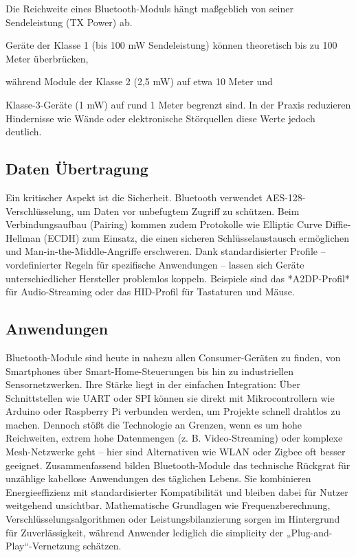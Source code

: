 Die Reichweite eines Bluetooth-Moduls hängt maßgeblich von seiner Sendeleistung (TX Power) ab. 

Geräte der Klasse 1 (bis 100 mW Sendeleistung) können theoretisch bis zu 100 Meter überbrücken, 

während Module der Klasse 2 (2,5 mW) auf etwa 10 Meter und

Klasse-3-Geräte (1 mW) auf rund 1 Meter begrenzt sind. In der Praxis reduzieren Hindernisse wie Wände oder elektronische Störquellen diese Werte jedoch deutlich.

\subsection*{Daten Übertragung}
Ein kritischer Aspekt ist die Sicherheit. Bluetooth verwendet AES-128-Verschlüsselung, um Daten vor unbefugtem Zugriff zu schützen. Beim Verbindungsaufbau (Pairing) kommen zudem Protokolle wie Elliptic Curve Diffie-Hellman (ECDH) zum Einsatz, die einen sicheren Schlüsselaustausch ermöglichen und Man-in-the-Middle-Angriffe erschweren. Dank standardisierter Profile – vordefinierter Regeln für spezifische Anwendungen – lassen sich Geräte unterschiedlicher Hersteller problemlos koppeln. Beispiele sind das *A2DP-Profil* für Audio-Streaming oder das HID-Profil für Tastaturen und Mäuse.

\subsection*{Anwendungen}

Bluetooth-Module sind heute in nahezu allen Consumer-Geräten zu finden, von Smartphones über Smart-Home-Steuerungen bis hin zu industriellen Sensornetzwerken. 
Ihre Stärke liegt in der einfachen Integration: Über Schnittstellen wie UART oder SPI können sie direkt mit Mikrocontrollern wie Arduino oder Raspberry Pi verbunden werden, um Projekte schnell drahtlos zu machen. 
Dennoch stößt die Technologie an Grenzen, wenn es um hohe Reichweiten, extrem hohe Datenmengen (z. B. Video-Streaming) oder komplexe Mesh-Netzwerke geht – hier sind Alternativen wie WLAN oder Zigbee oft besser geeignet.
Zusammenfassend bilden Bluetooth-Module das technische Rückgrat für unzählige kabellose Anwendungen des täglichen Lebens. Sie kombinieren Energieeffizienz mit standardisierter Kompatibilität und bleiben dabei für Nutzer weitgehend unsichtbar. Mathematische Grundlagen wie Frequenzberechnung, Verschlüsselungsalgorithmen oder Leistungsbilanzierung sorgen im Hintergrund für Zuverlässigkeit, während Anwender lediglich die simplicity der „Plug-and-Play“-Vernetzung schätzen.

